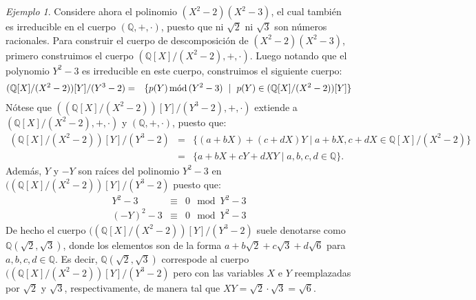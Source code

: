 \documentclass[10pt]{article}
\newcommand{\0}{\mathbf{0}}
\newcommand{\1}{\mathbf{1}}
\newcommand{\modl}{\mod}
\newcommand{\mods}{\,\text{\rm mód}\,}
\newcommand{\+}{\oplus}
\theoremstyle{remark}
\newtheorem{example}[theorem]{Ejemplo}
\theoremstyle{remark}
\begin{document}
\begin{example}
Considere ahora el polinomio $(X^2-2)(X^2-3)$, el cual también es
irreducible en el cuerpo $(\mathbb{Q},+,\cdot)$, puesto que ni
$\sqrt{2}$ ni $\sqrt{3}$ son números racionales. Para construir el
cuerpo de descomposición de $(X^2-2)(X^2-3)$, primero construimos el
cuerpo $(\mathbb{Q}[X]/(X^2-2), +, \cdot)$. Luego notando que el
polynomio $Y^2 - 3$ es irreducible en este cuerpo, construimos el
siguiente cuerpo:
\begin{eqnarray*}
  (\mathbb{Q}[X]/(X^2-2))[Y]/(Y^3-2) & = & \{p(Y) \mods (Y^2-3)  \ \mid \  p(Y)\in (\mathbb{Q}[X]/(X^2-2))[Y]\}
\end{eqnarray*}
Nótese que $((\mathbb{Q}[X]/(X^2-2))[Y]/(Y^3-2),+,\cdot)$ extiende a
$(\mathbb{Q}[X]/(X^2-2),+,\cdot)$ y  $(\mathbb{Q},+,\cdot)$, puesto
que:
\begin{eqnarray*}
  (\mathbb{Q}[X]/(X^2-2))[Y]/(Y^3-2) & = & \{(a+bX) + (c+dX)Y  \mid  a+bX, c+dX \in \mathbb{Q}[X]/(X^2-2)\}\\
  & = & \{ a+ bX + cY + dXY  \mid  a,b,c,d \in \mathbb{Q}\}.
\end{eqnarray*}
Además, $Y$ y $-Y$ son raíces del polinomio $Y^2-3$ en
$((\mathbb{Q}[X]/(X^2-2))[Y]/(Y^3-2)$ puesto que:
\begin{eqnarray*}
  Y^2 - 3 & \equiv & 0 \modl Y^2 - 3\\
  (-Y)^2 - 3 & \equiv & 0 \modl Y^2 - 3
\end{eqnarray*}
De hecho el cuerpo $((\mathbb{Q}[X]/(X^2-2))[Y]/(Y^3-2)$ suele
denotarse como $\mathbb{Q}(\sqrt{2},\sqrt{3})$, donde los
elementos son de la forma $a + b\sqrt{2} + c\sqrt{3} + d \sqrt{6}$
para $a,b,c,d \in \mathbb{Q}$. Es decir,
$\mathbb{Q}(\sqrt{2},\sqrt{3})$ correspode al cuerpo
$((\mathbb{Q}[X]/(X^2-2))[Y]/(Y^3-2)$ pero con las variables $X$ e $Y$
reemplazadas por $\sqrt{2}$ y $\sqrt{3}$, respectivamente, de manera
tal que $XY = \sqrt{2} \cdot \sqrt{3} = \sqrt{6}$.


\end{example}
\end{document}
